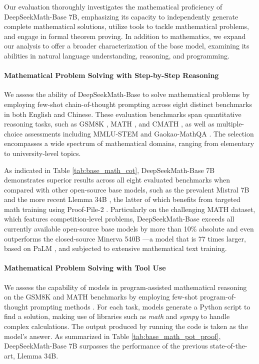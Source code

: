 \begin{itemize}[topsep=0pt]
Our evaluation thoroughly investigates the mathematical proficiency of DeepSeekMath-Base 7B, emphasizing its capacity to independently generate complete mathematical solutions, utilize tools to tackle mathematical problems, and engage in formal theorem proving. In addition to mathematics, we expand our analysis to offer a broader characterization of the base model, examining its abilities in natural language understanding, reasoning, and programming.

\paragraph{Mathematical Problem Solving with Step-by-Step Reasoning}

We assess the ability of DeepSeekMath-Base to solve mathematical problems by employing few-shot chain-of-thought prompting \citep{cot} across eight distinct benchmarks in both English and Chinese. These evaluation benchmarks span quantitative reasoning tasks, such as GSM8K \citep{gsm8k}, MATH \citep{MATH}, and CMATH \citep{wei2023cmath}, as well as multiple-choice assessments including MMLU-STEM \citep{mmlu} and Gaokao-MathQA \citep{agieval}. The selection encompasses a wide spectrum of mathematical domains, ranging from elementary to university-level topics.

As indicated in Table \ref{tab:base_math_cot}, DeepSeekMath-Base 7B demonstrates superior results across all eight evaluated benchmarks when compared with other open-source base models, such as the prevalent Mistral 7B \citep{mistral} and the more recent Llemma 34B \citep{llemma}, the latter of which benefits from targeted math training using Proof-Pile-2 \citep{llemma}. Particularly on the challenging MATH dataset, which features competition-level problems, DeepSeekMath-Base exceeds all currently available open-source base models by more than 10\% absolute and even outperforms the closed-source Minerva 540B \citep{minerva}—a model that is 77 times larger, based on PaLM \citep{palm}, and subjected to extensive mathematical text training.

\paragraph{Mathematical Problem Solving with Tool Use} We assess the capability of models in program-assisted mathematical reasoning on the GSM8K and MATH benchmarks by employing few-shot program-of-thought prompting methods \citep{pot,pal}. For each task, models generate a Python script to find a solution, making use of libraries such as \textit{math} and \textit{sympy} to handle complex calculations. The output produced by running the code is taken as the model’s answer. As summarized in Table \ref{tab:base_math_pot_proof}, DeepSeekMath-Base 7B surpasses the performance of the previous state-of-the-art, Llemma 34B.


\end{itemize}
